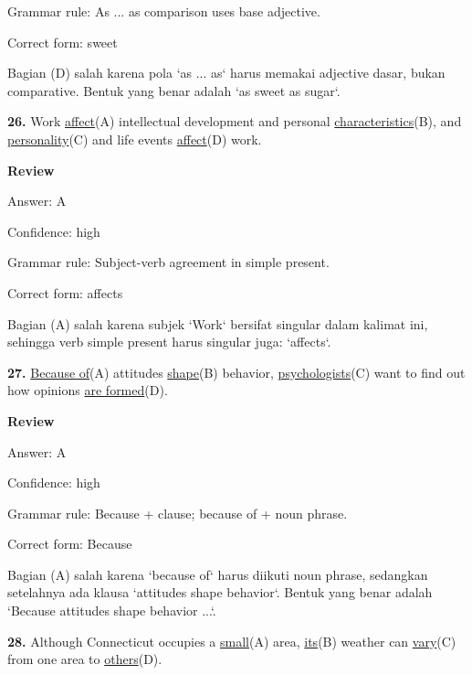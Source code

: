 \documentclass[12pt]{article}
\begin{document}
Grammar rule: As ... as comparison uses base adjective.\par
Correct form: sweet\par
Bagian (D) salah karena pola `as ... as` harus memakai adjective dasar, bukan comparative. Bentuk yang benar adalah `as sweet as sugar`.\par
\endgroup
\par
\vspace{\questionblockgap}
\noindent\textbf{26.} Work \uline{affect}(A) intellectual development and personal \uline{characteristics}(B), and \uline{personality}(C) and life events \uline{affect}(D) work.
\par
\begingroup
\setlength{\parskip}{0pt}
\setlength{\parindent}{0pt}
\textbf{Review}\par
Answer: A\par
Confidence: high\par
Grammar rule: Subject-verb agreement in simple present.\par
Correct form: affects\par
Bagian (A) salah karena subjek `Work` bersifat singular dalam kalimat ini, sehingga verb simple present harus singular juga: `affects`.\par
\endgroup
\par
\vspace{\questionblockgap}
\noindent\textbf{27.} \uline{Because of}(A) attitudes \uline{shape}(B) behavior, \uline{psychologists}(C) want to find out how opinions \uline{are formed}(D).
\par
\begingroup
\setlength{\parskip}{0pt}
\setlength{\parindent}{0pt}
\textbf{Review}\par
Answer: A\par
Confidence: high\par
Grammar rule: Because + clause; because of + noun phrase.\par
Correct form: Because\par
Bagian (A) salah karena `because of` harus diikuti noun phrase, sedangkan setelahnya ada klausa `attitudes shape behavior`. Bentuk yang benar adalah `Because attitudes shape behavior ...`.\par
\endgroup
\par
\vspace{\questionblockgap}
\noindent\textbf{28.} Although Connecticut occupies a \uline{small}(A) area, \uline{its}(B) weather can \uline{vary}(C) from one area to \uline{others}(D).
\par
\begingroup
\setlength{\parskip}{0pt}
\end{document}
